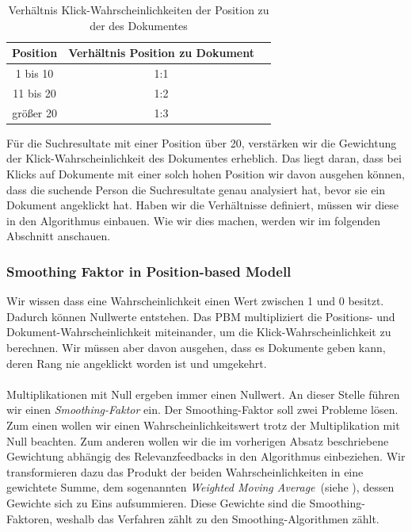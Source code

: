 \begin{table}[H]
\centering
\begin{tabular}{|c|c|c|}\hline
	\textbf{Position} & \textbf{Verhältnis Position zu Dokument}\\ \hline
	1 bis 10 & 1:1 \\ \hline
	11 bis 20 & 1:2 \\ \hline
	größer 20 &  1:3 \\ \hline
 \end{tabular}
 \vspace{.5em}
 \caption[Verhältnis Klick-Wahrscheinlichkeiten der Position zu der des Dokumentes]{Verhältnis Klick-Wahrscheinlichkeiten der Position zu der des Dokumentes}
\label{tab:VerhaeltnisKlick-WahrscheinlichkeitenPositionDokument}
\vspace{-2.5em}
\end{table}

Für die Suchresultate mit einer Position über 20, verstärken wir die Gewichtung der Klick-Wahrscheinlichkeit des Dokumentes erheblich. Das liegt daran, dass bei Klicks auf Dokumente mit einer solch hohen Position wir davon ausgehen können, dass die suchende Person die Suchresultate genau analysiert hat, bevor sie ein Dokument angeklickt hat. Haben wir die Verhältnisse definiert, müssen wir diese in den Algorithmus einbauen. Wie wir dies machen, werden wir im folgenden Abschnitt anschauen.

\subsubsection{Smoothing Faktor in Position-based Modell}
\label{sec:Reranking:Methodik:Result-RerankingPBM:SmoothingPBM}

Wir wissen dass eine Wahrscheinlichkeit einen Wert zwischen 1 und 0 besitzt. Dadurch können Nullwerte entstehen. Das PBM multipliziert die Positions- und Dokument-Wahrscheinlichkeit miteinander, um die Klick-Wahrscheinlichkeit zu berechnen. Wir müssen aber davon ausgehen, dass es Dokumente geben kann, deren Rang nie angeklickt worden ist und umgekehrt. 
\\
\\
Multiplikationen mit Null ergeben immer einen Nullwert. An dieser Stelle führen wir einen \textit{Smoothing-Faktor} ein. Der Smoothing-Faktor soll zwei Probleme lösen. Zum einen wollen wir einen Wahrscheinlichkeitswert trotz der Multiplikation mit Null beachten. Zum anderen wollen wir die im vorherigen Absatz beschriebene Gewichtung abhängig des Relevanzfeedbacks in den Algorithmus einbeziehen. Wir transformieren dazu das Produkt der beiden Wahrscheinlichkeiten in eine gewichtete Summe, dem sogenannten \textit{Weighted Moving Average}~(siehe \cite{weightedAVG}), dessen Gewichte sich zu Eins aufsummieren. Diese Gewichte sind die Smoothing-Faktoren, weshalb das Verfahren zählt zu den Smoothing-Algorithmen zählt.

